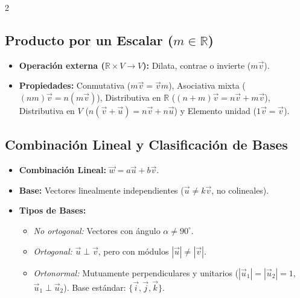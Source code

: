 \documentclass[9pt,a4paper]{article}
\begin{document}
\begin{multicols}{2}
\subsection{Producto por un Escalar ($m \in \mathbb{R}$)}
\begin{itemize}
    \item \textbf{Operación externa ($\mathbb{R} \times V \to V$):} Dilata, contrae o invierte ($m\vec{v}$).
    \item \textbf{Propiedades:} Conmutativa ($m\vec{v}=\vec{v}m$), Asociativa mixta ($(nm)\vec{v}=n(m\vec{v})$), Distributiva en $\mathbb{R}$ ($(n+m)\vec{v}=n\vec{v}+m\vec{v}$), Distributiva en $V$ ($n(\vec{v}+\vec{u})=n\vec{v}+n\vec{u}$) y Elemento unidad ($1\vec{v}=\vec{v}$).
\end{itemize}

\subsection{Combinación Lineal y Clasificación de Bases}
\begin{itemize}
    \item \textbf{Combinación Lineal:} $\vec{w} = a\vec{u} + b\vec{v}$.
    \item \textbf{Base:} Vectores linealmente independientes ($\vec{u} \neq k\vec{v}$, no colineales).
    \item \textbf{Tipos de Bases:}
    \begin{itemize}
        \item \textit{No ortogonal:} Vectores con ángulo $\alpha \neq 90^\circ$.
        \item \textit{Ortogonal:} $\vec{u} \perp \vec{v}$, pero con módulos $|\vec{u}| \neq |\vec{v}|$.
        \item \textit{Ortonormal:} Mutuamente perpendiculares y unitarios ($|\vec{u}_1|=|\vec{u}_2|=1$, $\vec{u}_1 \perp \vec{u}_2$). Base estándar: $\{\vec{i}, \vec{j}, \vec{k}\}$.
    \end{itemize}
\end{itemize}


\end{multicols}
\end{document}
